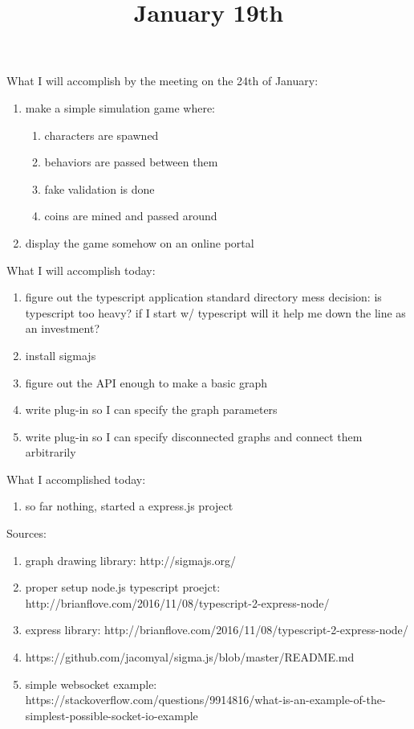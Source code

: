 \title{January 19th}


What I will accomplish by the meeting on the 24th of January:

\begin{enumerate}
	\item make a simple simulation game where:
		\begin{enumerate}
			\item characters are spawned
			\item behaviors are passed between them
			\item fake validation is done 
			\item coins are mined and passed around
		\end{enumerate}
	\item display the game somehow on an online portal
\end{enumerate}

What I will accomplish today:

\begin{enumerate}
	\item figure out the typescript application standard directory mess
		decision: is typescript too heavy?
		if I start w/ typescript will it help me down the line as an investment?
	\item install sigmajs
	\item figure out the API enough to make a basic graph
	\item write plug-in so I can specify the graph parameters
	\item write plug-in so I can specify disconnected graphs and connect them arbitrarily
\end{enumerate}

What I accomplished today:

\begin{enumerate}
	\item so far nothing, started a express.js project
\end{enumerate}

Sources:

\begin{enumerate}
	\item graph drawing library: http://sigmajs.org/
	\item proper setup node.js typescript proejct: http://brianflove.com/2016/11/08/typescript-2-express-node/
	\item express library: http://brianflove.com/2016/11/08/typescript-2-express-node/
	\item https://github.com/jacomyal/sigma.js/blob/master/README.md
	\item simple websocket example: https://stackoverflow.com/questions/9914816/what-is-an-example-of-the-simplest-possible-socket-io-example
\end{enumerate}
